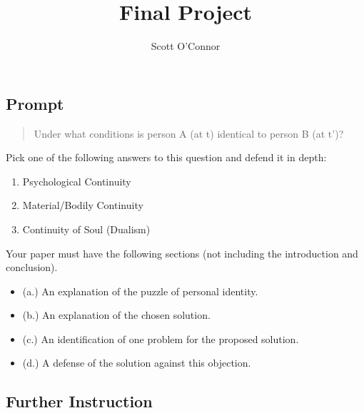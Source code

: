 \documentclass[]{article}
\title{Final Project}
\author{Scott O’Connor}
\providecommand{\tightlist}{%
  \setlength{\itemsep}{0pt}\setlength{\parskip}{0pt}}
\begin{document}
\maketitle

\subsection{Prompt}\label{prompt}

\begin{quote}
Under what conditions is person A (at t) identical to person B (at t')?
\end{quote}

Pick one of the following answers to this question and defend it in
depth:

\begin{enumerate}
\def\labelenumi{\arabic{enumi}.}
\tightlist
\item
  Psychological Continuity
\item
  Material/Bodily Continuity
\item
  Continuity of Soul (Dualism)
\end{enumerate}

Your paper must have the following sections (not including the
introduction and conclusion).

\begin{itemize}
\tightlist
\item
  (a.) An explanation of the puzzle of personal identity.
\item
  (b.) An explanation of the chosen solution.\\
\item
  (c.) An identification of one problem for the proposed solution.
\item
  (d.) A defense of the solution against this objection.
\end{itemize}

\subsection{Further Instruction}\label{further-instruction}
\end{document}
